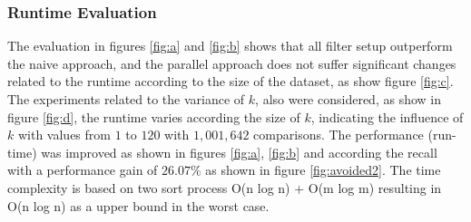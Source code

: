 \subsubsection{Runtime Evaluation}

The evaluation in figures \ref{fig:a} and \ref{fig:b} shows that all filter setup outperform the naive approach, and the parallel approach does not suffer significant changes related to the runtime according to the size of the dataset, as show figure \ref{fig:c}.
The experiments related to the variance of $k$, also were considered, as show in figure \ref{fig:d}, the runtime varies according the size of $k$, indicating the influence of $k$ with values from $1$ to $120$ with $1,001,642$ comparisons.
The performance (run-time) was improved as shown in figures  \ref{fig:a}, \ref{fig:b} and according the recall with a performance gain of $26.07 \%$ as shown in figure \ref{fig:avoided2}. The time complexity is based on two sort process O(n log n) + O(m log m) resulting in O(n log n) as a upper bound in the worst case.

